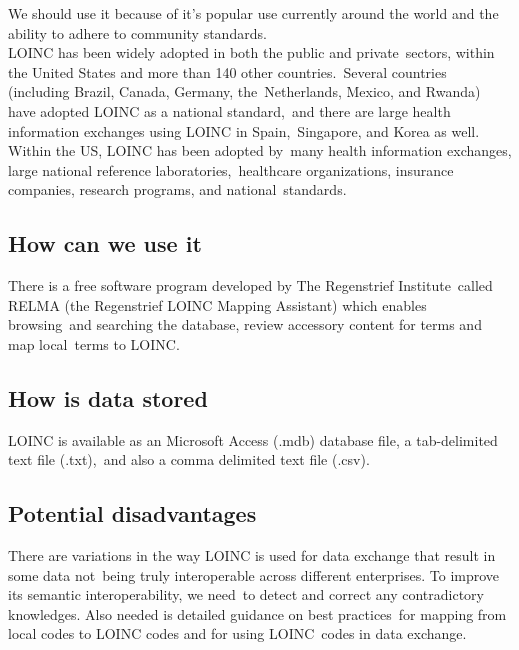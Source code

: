 We should use it because of it's popular use currently around the world and the ability to adhere to community standards.\\

\noindent LOINC has been widely adopted in both the public and private\
sectors, within the United States and more than 140 other countries.\
Several countries (including Brazil, Canada, Germany, the\
Netherlands, Mexico, and Rwanda) have adopted LOINC as a national standard,\
 and there are large health information exchanges using LOINC in Spain,\
 Singapore, and Korea as well. Within the US, LOINC has been adopted by\
 many health information exchanges, large national reference laboratories,\
 healthcare organizations, insurance companies, research programs, and national\
standards. \citep{kroth_using_2012} 

 \subsection{How can we use it}

  There is a free software program developed by The Regenstrief Institute\
  called RELMA (the Regenstrief LOINC Mapping Assistant) which enables browsing\
  and searching the database, review accessory content for terms and map local\
  terms to LOINC. \citep{kroth_using_2012} 

  \subsection{How is data stored}

LOINC is available as an Microsoft Access (.mdb) database file, a tab-delimited text file (.txt),\
 and also a comma delimited text file (.csv). \citep{_Vreeman_2013}\

 \subsection{Potential disadvantages}

 There are variations in the way LOINC is used for data exchange that result in some data not\
being truly interoperable across different enterprises. To improve its semantic interoperability, we need\
to detect and correct any contradictory knowledges. Also needed is detailed guidance on best practices\
for mapping from local codes to LOINC codes and for using LOINC\ 
codes in data exchange. \citep{lin_auditing_2012}



